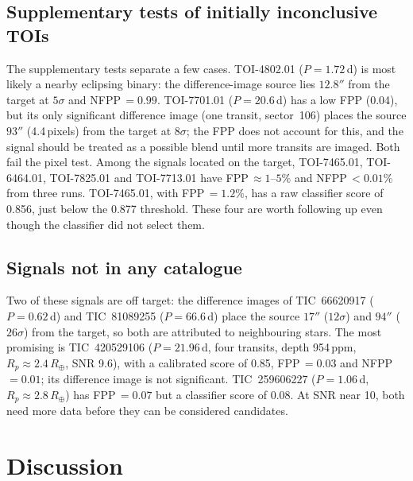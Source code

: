 \documentclass{aastex701}
\begin{document}
\clearpage
\subsection{Supplementary tests of initially inconclusive TOIs}\label{sec:inconclusive}




The supplementary tests separate a few cases. TOI-4802.01 ($P=1.72$\,d) is most likely a nearby
eclipsing binary: the difference-image source lies $12.8''$ from the target at $5\sigma$ and
NFPP\,$=0.99$. TOI-7701.01 ($P=20.6$\,d) has a low FPP (0.04), but its only significant difference
image (one transit, sector~106) places the source $93''$ (4.4\,pixels) from the target at $8\sigma$; the
FPP does not account for this, and the signal should be treated as a possible blend until more transits
are imaged. Both fail the pixel test. Among the signals located on the target, TOI-7465.01, TOI-6464.01, TOI-7825.01 and TOI-7713.01 have
FPP\,$\approx 1$--$5\%$ and NFPP\,$<0.01\%$ from three runs.
TOI-7465.01, with FPP\,$=1.2\%$, has a raw classifier score of 0.856, just below the 0.877
threshold. These four are worth following up even though the classifier did not select them.

\subsection{Signals not in any catalogue}




Two of these signals are off target: the difference images of TIC~66620917 ($P=0.62$\,d) and
TIC~81089255 ($P=66.6$\,d) place the source $17''$ ($12\sigma$) and $94''$ ($26\sigma$) from the
target, so both are attributed to neighbouring stars. The most promising is TIC~420529106
($P=21.96$\,d, four transits, depth 954\,ppm, $R_p\approx2.4\,R_\oplus$, SNR 9.6), with a
calibrated score of 0.85, FPP\,$=0.03$ and NFPP\,$=0.01$; its difference image is not significant.
TIC~259606227 ($P=1.06$\,d, $R_p\approx2.8\,R_\oplus$) has FPP\,$=0.07$ but a classifier score of
0.08. At SNR near 10, both need more data before they can be considered candidates.

\section{Discussion}\label{sec:discussion}
\end{document}

